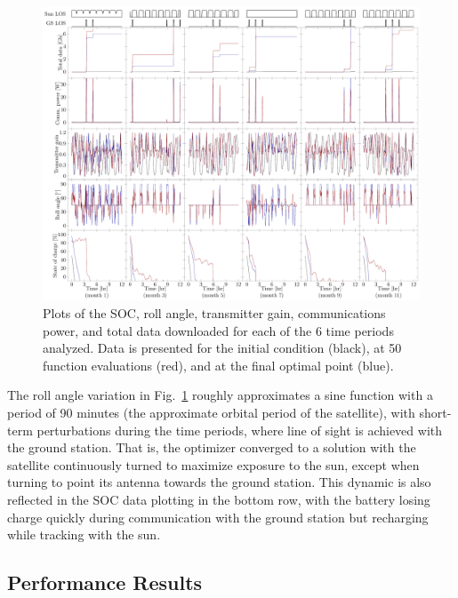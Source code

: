 \documentclass[]{aiaa-tc} %
\begin{document}
        \begin{figure}[!htb]
          \centering
          \includegraphics[width=\textwidth]{images/cadre_data}
          \caption[width=0.4\textwidth]{Plots of the SOC, roll angle, transmitter gain, communications power, and total data downloaded for
          each of the 6 time periods analyzed. Data is presented for the initial condition (black), at 50 function evaluations (red), and at the final
          optimal point (blue).
          \label{cadre_data_results}
          }
        \end{figure}


        The roll angle variation in Fig.~\ref{cadre_data_results} roughly approximates a sine function
        with a period of 90 minutes (the approximate orbital period of the satellite), with short-term perturbations during the time
        periods, where line of sight is achieved with the ground station. That is, the optimizer
        converged to a solution with the satellite continuously turned to maximize exposure to the sun,
        except when turning to point its antenna towards the ground station. This dynamic is also reflected in the SOC
        data plotting in the bottom row, with the battery losing charge quickly during
        communication with the ground station but recharging while tracking with the sun.

        \clearpage


        \subsection{Performance Results}
\end{document}

